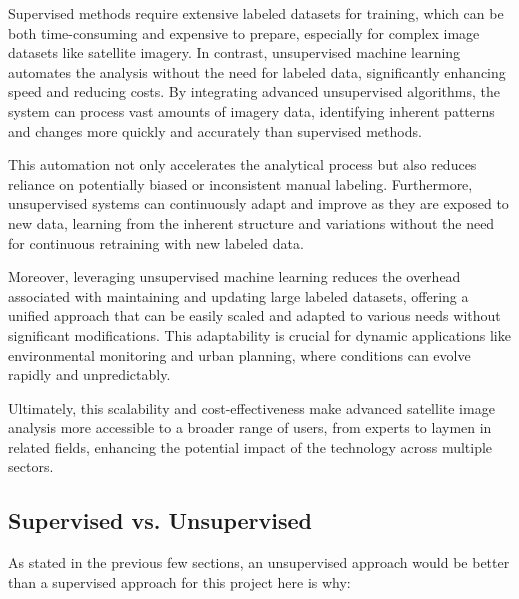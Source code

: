 Supervised methods require extensive labeled datasets for training, which can be both time-consuming and expensive to prepare,
especially for complex image datasets like satellite imagery.
In contrast, unsupervised machine learning automates the analysis without the need for labeled data,
significantly enhancing speed and reducing costs.
By integrating advanced unsupervised algorithms, the system can process vast amounts of imagery data,
identifying inherent patterns and changes more quickly and accurately than supervised methods.

This automation not only accelerates the analytical process but also reduces reliance on potentially biased or inconsistent manual labeling.
Furthermore, unsupervised systems can continuously adapt and improve as they are exposed to new data,
learning from the inherent structure and variations without the need for continuous retraining with new labeled data.

Moreover, leveraging unsupervised machine learning reduces the overhead associated with maintaining and updating large labeled datasets,
offering a unified approach that can be easily scaled and adapted to various needs without significant modifications.
This adaptability is crucial for dynamic applications like environmental monitoring and urban planning\cite{dynamicMonitoring2022}, where conditions can
evolve rapidly and unpredictably.

Ultimately, this scalability and cost-effectiveness make advanced satellite image analysis more accessible to a broader range
of users, from experts to laymen in related fields, enhancing the potential impact of the technology across multiple sectors.

\subsection{Supervised vs. Unsupervised}\label{subsec:supervised-vs.-unsupervised}

As stated in the previous few sections, an unsupervised approach would be better than a supervised approach for this project
here is why:

